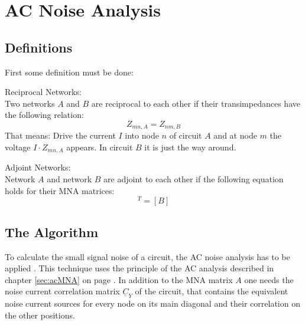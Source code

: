 %
%
%
%

\chapter{AC Noise Analysis}

\section{Definitions}

First some definition must be done:

\addvspace{12pt}

Reciprocal Networks:\\
Two networks $A$ and $B$ are reciprocal to each other if their
transimpedances have the following relation:
\begin{equation}
Z_{mn,A} = Z_{nm,B}
\end{equation}
That means: Drive the current $I$ into node $n$ of circuit $A$ and
at node $m$ the voltage $I\cdot Z_{mn,A}$ appears. In circuit $B$
it is just the way around.

\addvspace{12pt}

Adjoint Networks:\\
Network $A$ and network $B$ are adjoint to each other if the
following equation holds for their MNA matrices:
\begin{equation}
[A]^T = [B]
\end{equation}


\section{The Algorithm}

To calculate the small signal noise of a circuit, the AC noise
analysis has to be applied \cite{Blum}.  This technique uses the
principle of the AC analysis described in chapter \ref{sec:acMNA} on
page \pageref{sec:acMNA}.  In addition to the MNA matrix $A$ one needs
the noise current correlation matrix $\underline{C}_Y$ of the circuit,
that contains the equivalent noise current sources for every node on
its main diagonal and their correlation on the other positions.

